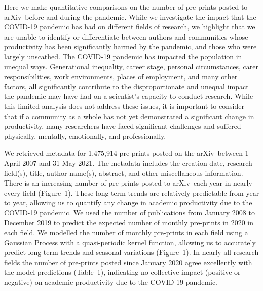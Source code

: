 \documentclass[a4paper,12pt]{article}
\newcommand{\arxiv}{arXiv}
\begin{document}
Here we make quantitative comparisons on the number of pre-prints posted to \arxiv\ before and during the pandemic. While we investigate the impact that the COVID-19 pandemic has had on different fields of research, we highlight that we are unable to identify or differentiate between authors and communities whose productivity has been significantly harmed by the pandemic, and those who were largely unscathed. The COVID-19 pandemic has impacted the population in unequal ways\cite{Nicola:2020,Chu:2020,IbnMohammed:2021}. Generational inequality, career stage, personal circumstances, carer responsibilities, work environments, places of employment, and many other factors, all significantly contribute to the disproportionate and unequal impact the pandemic may have had on a scientist's capacity to conduct research. 
While this limited analysis does not address these issues, it is important to consider that if a community as a whole has not yet demonstrated a significant change in productivity, many researchers have faced significant challenges and suffered physically, mentally, emotionally, and professionally. 


We retrieved metadata for 1,475,914 pre-prints posted on the \arxiv\ between 1 April 2007 and 31 May 2021. The metadata includes the creation date, research field(s), title, author name(s), abstract, and other miscellaneous information\cite{Clement:2019}. There is an increasing number of pre-prints posted to \arxiv\ each year in nearly every field (Figure~1). These long-term trends are relatively predictable from year to year, allowing us to quantify any change in academic productivity due to the COVID-19 pandemic. We used the number of publications from January 2008 to December 2019 to predict the expected number of monthly pre-prints in 2020 in each field. We modelled the number of monthly pre-prints in each field using a Gaussian Process with a quasi-periodic kernel function\cite{Rasmussen:2006,Ambikasaran:2014}, allowing us to accurately predict long-term trends and seasonal variations (Figure~1). In nearly all research fields the number of pre-prints posted since January 2020 agree excellently with the model predictions (Table~1), indicating no collective impact (positive or negative) on academic productivity due to the COVID-19 pandemic.
\end{document}
